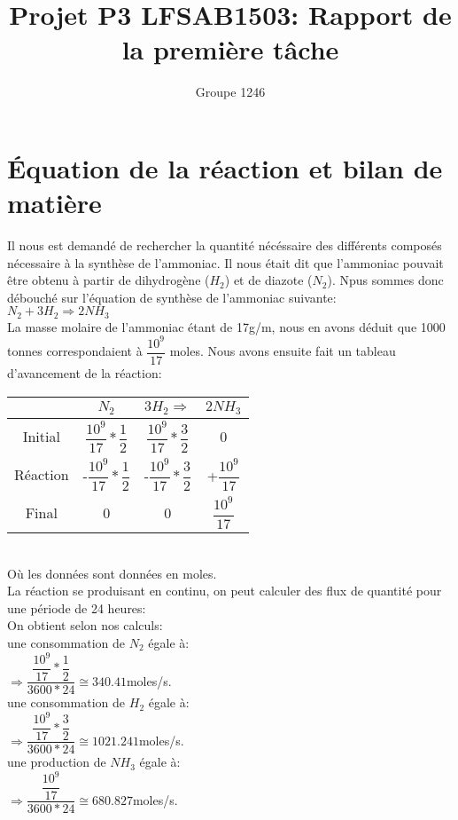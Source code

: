 \documentclass[11pt,a4paper]{report}
\author{Groupe 1246}
\title{Projet P3 LFSAB1503: Rapport de la première tâche}
\begin{document}
\maketitle
\section{Équation de la réaction et bilan de matière}
Il nous est demandé de rechercher la quantité nécéssaire des différents composés nécessaire à la synthèse de l'ammoniac. Il nous était dit que l'ammoniac pouvait être obtenu à partir de dihydrogène ($H_2$) et de diazote ($N_2$). Npus sommes donc débouché sur l'équation de synthèse de l'ammoniac suivante: \\
$N_2 + 3H_2 \Rightarrow 2NH_3$ \\
La masse molaire de l'ammoniac étant de 17g/m, nous en avons déduit que 1000 tonnes correspondaient à $\dfrac{10^{9}}{17}$ moles. Nous avons ensuite fait un tableau d'avancement de la réaction: \\
\begin{tabular}{|c|c|c|c|}
\hline 
 & $N_2$ & $3H_2 \Rightarrow$ & $2NH_3$ \\ 
\hline 
Initial & $\dfrac{10^{9}}{17}*\dfrac{1}{2}$ & $\dfrac{10^{9}}{17}*\dfrac{3}{2}$ & 0 \\ 
\hline 
Réaction & -$\dfrac{10^{9}}{17}*\dfrac{1}{2}$ & -$\dfrac{10^{9}}{17}*\dfrac{3}{2}$ & +$\dfrac{10^{9}}{17}$ \\ 
\hline 
Final & 0 & 0 & $\dfrac{10^{9}}{17}$ \\ 
\hline 
\end{tabular} 
\\
Où les données sont données en moles. 
\\
La réaction se produisant en continu, on peut calculer des flux de quantité pour une période de 24 heures:\\
On obtient selon nos calculs:\\ une consommation de $N_2$ égale à: \\
$\Rightarrow \dfrac{\dfrac{10^{9}}{17}*\dfrac{1}{2}}{3600*24} \cong 340.41 $moles/s.\\
une consommation de $H_2$ égale à: \\
$\Rightarrow \dfrac{\dfrac{10^{9}}{17}*\dfrac{3}{2}}{3600*24} \cong 1021.241 $moles/s.\\
une production de $NH_3$ égale à: \\
$\Rightarrow \dfrac{\dfrac{10^{9}}{17}}{3600*24} \cong 680.827 $moles/s.\\
\end{document}
